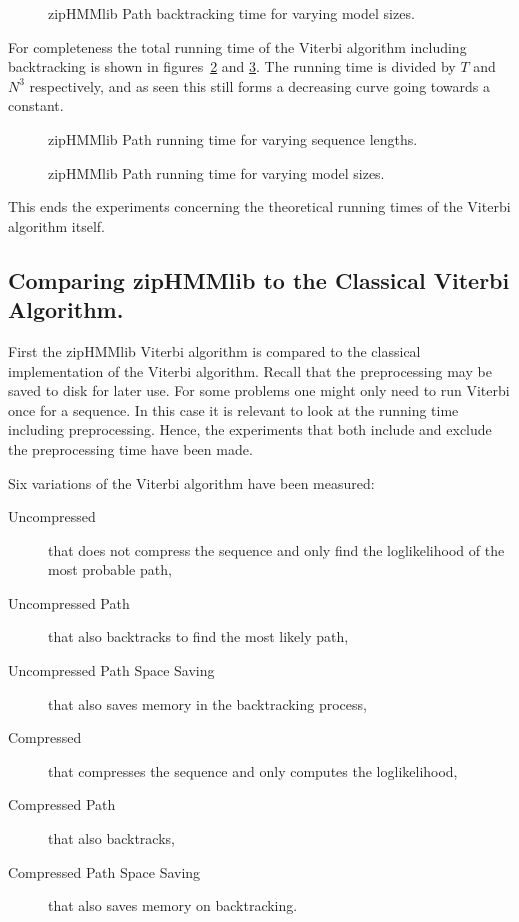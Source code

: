 \begin{figure}
  \centering
  
  \caption{zipHMMlib Path backtracking time for varying model sizes.}
  \label{fig:assymptotic_viterbi_backtrack_k}
\end{figure}

For completeness the total running time of the Viterbi algorithm including
backtracking is shown in figures~\ref{fig:assymptotic_viterbi_path_n} and
\ref{fig:assymptotic_viterbi_path_k}. The running time is divided by $T$ and
$N^3$ respectively, and as seen this still forms a decreasing curve going
towards a constant.

\begin{figure}
  \centering
  
  \caption{zipHMMlib Path running time for varying sequence lengths.}
  \label{fig:assymptotic_viterbi_path_n}
\end{figure}

\begin{figure}
  \centering
  
  \caption{zipHMMlib Path running time for varying model sizes.}
  \label{fig:assymptotic_viterbi_path_k}
\end{figure}

This ends the experiments concerning the theoretical running times of the
Viterbi algorithm itself.

\subsection{Comparing zipHMMlib to the Classical Viterbi Algorithm.}

First the zipHMMlib Viterbi algorithm is compared to the classical
implementation of the Viterbi algorithm. Recall that the preprocessing may be
saved to disk for later use. For some problems one might only need to run
Viterbi once for a sequence. In this case it is relevant to look at the running time
including preprocessing. Hence, the experiments that both include and exclude
the preprocessing time have been made.

Six variations of the Viterbi algorithm have been measured:
\begin{description}
\item[Uncompressed] that does not compress the sequence and only find the
  loglikelihood of the most probable path,
\item[Uncompressed Path] that also backtracks to find the most likely path,
\item[Uncompressed Path Space Saving] that also saves memory in the
  backtracking process,
\item[Compressed] that compresses the sequence and only computes the
  loglikelihood,
\item[Compressed Path] that also backtracks,
\item[Compressed Path Space Saving] that also saves memory on backtracking.
\end{description}


